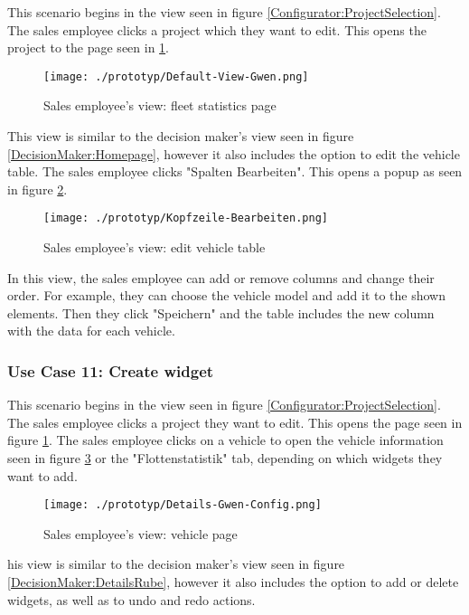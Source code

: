 This scenario begins in the view seen in figure \ref{Configurator:ProjectSelection}. The sales employee clicks a project which they want to edit. This opens the project to the page seen in \ref{Sales:VehicleList}. 

\begin{figure}[H]
  \centering
  \texttt{[image: ./prototyp/Default-View-Gwen.png]}
  \caption{Sales employee's view: fleet statistics page}
  \label{Sales:VehicleList}
\end{figure}

This view is similar to the decision maker's view seen in figure \ref{DecisionMaker:Homepage}, however it also includes the option to edit the vehicle table. The sales employee clicks "Spalten Bearbeiten". This opens a popup as seen in figure \ref{Sales:EditTable}.

\begin{figure}[ht]
  \centering
  \texttt{[image: ./prototyp/Kopfzeile-Bearbeiten.png]}
  \caption{Sales employee's view: edit vehicle table}
  \label{Sales:EditTable}
\end{figure}

In this view, the sales employee can add or remove columns and change their order. For example, they can choose the vehicle model and add it to the shown elements. Then they click "Speichern" and the table includes the new column with the data for each vehicle.


\subsubsection{Use Case 11: Create \Gls{widget}}

This scenario begins in the view seen in figure \ref{Configurator:ProjectSelection}. The sales employee clicks a project they want to edit. This opens the page seen in figure \ref{Sales:VehicleList}. The sales employee clicks on a vehicle to open the vehicle information seen in figure \ref{Sales:VehicleInformation} or the "Flottenstatistik" tab, depending on which \glspl{widget} they want to add.

\begin{figure}[ht]
  \centering
  \texttt{[image: ./prototyp/Details-Gwen-Config.png]}
  \caption{Sales employee's view: vehicle page}
  \label{Sales:VehicleInformation}
\end{figure}

his view is similar to the decision maker's view seen in figure \ref{DecisionMaker:DetailsRube}, however it also includes the option to add or delete \glspl{widget}, as well as to undo and redo actions.

